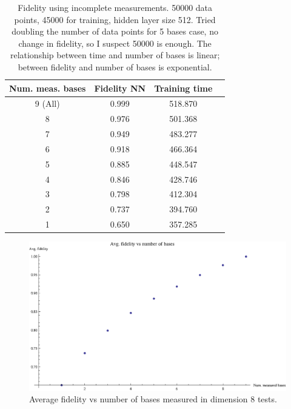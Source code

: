 \documentclass[a4paper,10pt]{article}
\begin{document}
\begin{table}[h!]
 \centering
 \begin{tabular}{|c||c|c|c|}
 \hline
  Num. meas. bases &  Fidelity NN & Training time \\ \hline
  9 (All) & 0.999 & 518.870 \\
  8 &0.976 & 501.368\\
  7 & 0.949 & 483.277 \\
  6 & 0.918 & 466.364 \\
  5 & 0.885&  448.547 \\
  4 & 0.846 & 428.746 \\
  3 & 0.798 &  412.304 \\
  2 &  0.737 & 394.760 \\ 
  1 & 0.650  & 357.285 \\ \hline
 \end{tabular}
 \caption{Fidelity using incomplete measurements. 50000 data points, 45000 for training, hidden layer size 512. Tried doubling the number of data points for 5 bases case, no change in fidelity, so I suspect 50000 is enough. The relationship between time and number of bases is linear; between fidelity and number of bases is exponential.}
 \label{tab:3qubits}
\end{table}

\begin{figure}
 \includegraphics[scale=0.8]{dim8_average_fidelity}
 \caption{Average fidelity vs number of bases measured in dimension 8 tests.}
 \label{fig:dim8_average_fidelity}
\end{figure}
\end{document}

